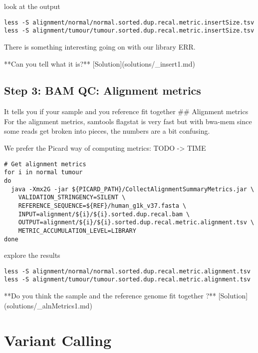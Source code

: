 look at the output

\begin{lstlisting}
less -S alignment/normal/normal.sorted.dup.recal.metric.insertSize.tsv
less -S alignment/tumour/tumour.sorted.dup.recal.metric.insertSize.tsv
\end{lstlisting}

There is something interesting going on with our library ERR.

**Can you tell what it is?** [Solution](solutions/_insert1.md)

\subsection{Step 3: BAM QC: Alignment metrics}
It tells you if your sample and you reference fit together
## Alignment metrics
For the alignment metrics, samtools flagstat is very fast but with bwa-mem since some reads get broken into pieces, the numbers are a bit confusing. 

We prefer the Picard way of computing metrics:
TODO -> TIME 
\begin{lstlisting}
# Get alignment metrics
for i in normal tumour
do
  java -Xmx2G -jar ${PICARD_PATH}/CollectAlignmentSummaryMetrics.jar \
    VALIDATION_STRINGENCY=SILENT \
    REFERENCE_SEQUENCE=${REF}/human_g1k_v37.fasta \
    INPUT=alignment/${i}/${i}.sorted.dup.recal.bam \
    OUTPUT=alignment/${i}/${i}.sorted.dup.recal.metric.alignment.tsv \
    METRIC_ACCUMULATION_LEVEL=LIBRARY
done
\end{lstlisting}

explore the results

\begin{lstlisting}
less -S alignment/normal/normal.sorted.dup.recal.metric.alignment.tsv
less -S alignment/tumour/tumour.sorted.dup.recal.metric.alignment.tsv

\end{lstlisting}

**Do you think the sample and the reference genome fit together ?** [Solution](solutions/_alnMetrics1.md)



\newpage


\section{Variant Calling}

